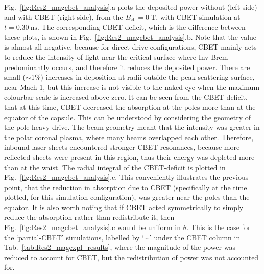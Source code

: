 Fig.~\ref{fig:Res2_magcbet_analysis}.a plots the deposited power without (left-side) and with-\ac{CBET} (right-side), from the $B_{z0}=0\ \text{T}$, with-\ac{CBET} simulation at $t=0.30\ \text{ns}$.
The corresponding \ac{CBET}-deficit, which is the difference between these plots, is shown in Fig.~\ref{fig:Res2_magcbet_analysis}.b.
Note that the value is almost all negative, because for direct-drive configurations, \ac{CBET} mainly acts to reduce the intensity of light near the critical surface where \ac{Inv-Brem} predominantly occurs, and therefore it reduces the deposited power.
There are small ($\sim$1\%) increases in deposition at radii outside the peak scattering surface, near Mach-1, but this increase is not visible to the naked eye when the maximum colourbar scale is increased above zero.
It can be seen from the \ac{CBET}-deficit, that at this time, \ac{CBET} decreased the absorption at the poles more than at the equator of the capsule.
This can be understood by considering the geometry of the pole heavy drive.
The beam geometry meant that the intensity was greater in the polar coronal plasma, where many beams overlapped each other.
Therefore, inbound laser sheets encountered stronger \ac{CBET} resonances, because more reflected sheets were present in this region, thus their energy was depleted more than at the waist.
The radial integral of the \ac{CBET}-deficit is plotted in Fig.~\ref{fig:Res2_magcbet_analysis}.c.
This conveniently illustrates the previous point, that the reduction in absorption due to \ac{CBET} (specifically at the time plotted, for this simulation configuration), was greater near the poles than the equator.
It is also worth noting that if \ac{CBET} acted symmetrically to simply reduce the absorption rather than redistribute it, then Fig.~\ref{fig:Res2_magcbet_analysis}.c would be uniform in $\theta$.
This is the case for the `partial-\ac{CBET}' simulations, labelled by `$\sim$' under the \ac{CBET} column in Tab.~\ref{tab:Res2_magexpl_results}, where the magnitude of the power was reduced to account for \ac{CBET}, but the redistribution of power was not accounted for.


